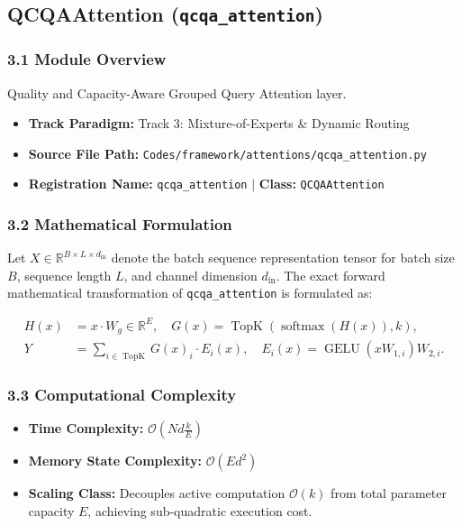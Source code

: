 \subsection{QCQAAttention (\texttt{qcqa\_attention})}
\label{sec:app_module_qcqa_attention}

\subsubsection*{3.1 Module Overview}
Quality and Capacity-Aware Grouped Query Attention layer.
\begin{itemize}
    \item \textbf{Track Paradigm:} Track 3: Mixture-of-Experts \& Dynamic Routing
    \item \textbf{Source File Path:} \texttt{Codes/framework/attentions/qcqa\_attention.py}
    \item \textbf{Registration Name:} \texttt{qcqa\_attention} $\mid$ \textbf{Class:} \texttt{QCQAAttention}
\end{itemize}

\subsubsection*{3.2 Mathematical Formulation}
Let $X \in \mathbb{R}^{B \times L \times d_{\text{in}}}$ denote the batch sequence representation tensor for batch size $B$, sequence length $L$, and channel dimension $d_{\text{in}}$. The exact forward mathematical transformation of \texttt{qcqa\_attention} is formulated as:

\begin{align}
H(x) &= x \cdot W_g \in \mathbb{R}^{E}, \quad G(x) = \operatorname{TopK}\left(\operatorname{softmax}(H(x)), k\right), \\
Y &= \sum_{i \in \operatorname{TopK}} G(x)_i \cdot E_i(x), \quad E_i(x) = \operatorname{GELU}(x W_{1, i}) W_{2, i}.
\end{align}


\subsubsection*{3.3 Computational Complexity}
\begin{itemize}
    \item \textbf{Time Complexity:} $\mathcal{O}(N d \frac{k}{E})$
    \item \textbf{Memory State Complexity:} $\mathcal{O}(E d^2)$
    \item \textbf{Scaling Class:} Decouples active computation $\mathcal{O}(k)$ from total parameter capacity $E$, achieving sub-quadratic execution cost.
\end{itemize}


